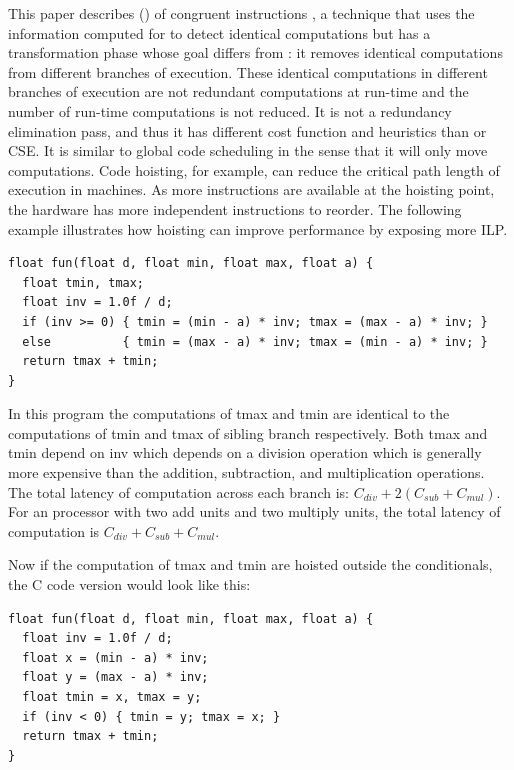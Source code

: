 \documentclass[acmlarge,review,anonymous]{acmart}\settopmatter{printfolios=true}
\begin{document}
This paper describes \gcm{} (\GCM{}) of congruent instructions
\cite{briggs1997}, a technique that uses the information computed for \PRE{} to
detect identical computations but has a transformation phase whose goal differs
from \PRE{}: it removes identical computations from different branches of
execution.  These identical computations in different branches of execution are
not redundant computations at run-time and the number of run-time computations
is not reduced. It is not a redundancy elimination pass, and thus it has
different cost function and heuristics than \PRE{} or CSE. It is similar to
global code scheduling \cite{dragonbook,click1995global} in the sense that it
will only move computations. Code hoisting, for example, can reduce the critical
path length of execution in \ooo{} machines. As more instructions are available
at the hoisting point, the hardware has more independent instructions to
reorder. The following example illustrates how hoisting can improve performance
by exposing more ILP.

\begin{verbatim}
float fun(float d, float min, float max, float a) {
  float tmin, tmax;
  float inv = 1.0f / d;
  if (inv >= 0) { tmin = (min - a) * inv; tmax = (max - a) * inv; }
  else          { tmin = (max - a) * inv; tmax = (min - a) * inv; }
  return tmax + tmin;
}
\end{verbatim}

In this program the computations of tmax and tmin are identical to the
computations of tmin and tmax of sibling branch respectively. Both tmax and tmin
depend on inv which depends on a division operation which is generally more
expensive than the addition, subtraction, and multiplication operations. The
total latency of computation across each branch is: $C_{div} + 2(C_{sub} + C_{mul})$.
For an \ooo{} processor with two add units and two multiply
units, the total latency of computation is $C_{div} + C_{sub} + C_{mul}$.

Now if the computation of tmax and tmin are hoisted outside the
conditionals, the C code version would look like this:
\begin{verbatim}
float fun(float d, float min, float max, float a) {
  float inv = 1.0f / d;
  float x = (min - a) * inv;
  float y = (max - a) * inv;
  float tmin = x, tmax = y;
  if (inv < 0) { tmin = y; tmax = x; }
  return tmax + tmin;
}
\end{verbatim}
\end{document}
